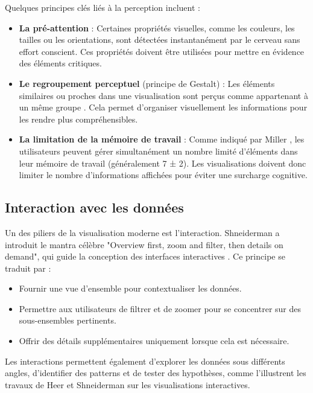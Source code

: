 \documentclass[runningheads]{llncs}
\begin{document}
Quelques principes clés liés à la perception incluent :
\begin{itemize}
    \item \textbf{La pré-attention} : Certaines propriétés visuelles, comme les couleurs, les tailles ou les orientations, sont détectées instantanément par le cerveau sans effort conscient. Ces propriétés doivent être utilisées pour mettre en évidence des éléments critiques.
    \item \textbf{Le regroupement perceptuel} (principe de Gestalt) : Les éléments similaires ou proches dans une visualisation sont perçus comme appartenant à un même groupe \cite{card_readings_1999}. Cela permet d'organiser visuellement les informations pour les rendre plus compréhensibles.
    \item \textbf{La limitation de la mémoire de travail} : Comme indiqué par Miller \cite{miller_magical_1956}, les utilisateurs peuvent gérer simultanément un nombre limité d'éléments dans leur mémoire de travail (généralement 7 ± 2). Les visualisations doivent donc limiter le nombre d'informations affichées pour éviter une surcharge cognitive.
\end{itemize}

\subsection{Interaction avec les données}
Un des piliers de la visualisation moderne est l'interaction. Shneiderman a introduit le mantra célèbre "Overview first, zoom and filter, then details on demand", qui guide la conception des interfaces interactives \cite{shneiderman_eyes_2003}. Ce principe se traduit par :
\begin{itemize}
    \item Fournir une vue d’ensemble pour contextualiser les données.
    \item Permettre aux utilisateurs de filtrer et de zoomer pour se concentrer sur des sous-ensembles pertinents.
    \item Offrir des détails supplémentaires uniquement lorsque cela est nécessaire.
\end{itemize}

Les interactions permettent également d’explorer les données sous différents angles, d’identifier des patterns et de tester des hypothèses, comme l’illustrent les travaux de Heer et Shneiderman \cite{heer_design_2012} sur les visualisations interactives.
\end{document}
